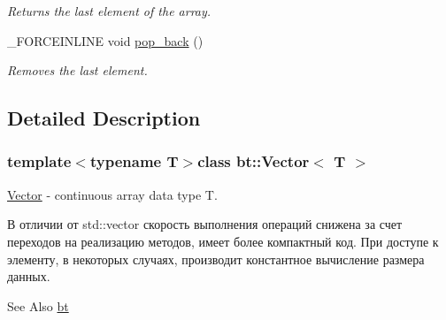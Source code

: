 \begin{DoxyCompactItemize}
\begin{DoxyCompactList}\small\item\em Returns the last element of the array. \end{DoxyCompactList}\item 
\hypertarget{classbt_1_1_vector_a422d57c4c5ee5e5d2ae2538fd973d2f7}{\-\_\-\-F\-O\-R\-C\-E\-I\-N\-L\-I\-N\-E void \hyperlink{classbt_1_1_vector_a422d57c4c5ee5e5d2ae2538fd973d2f7}{pop\-\_\-back} ()}\label{classbt_1_1_vector_a422d57c4c5ee5e5d2ae2538fd973d2f7}

\begin{DoxyCompactList}\small\item\em Removes the last element. \end{DoxyCompactList}\end{DoxyCompactItemize}


\subsection{Detailed Description}
\subsubsection*{template$<$typename T$>$class bt\-::\-Vector$<$ T $>$}

\hyperlink{classbt_1_1_vector}{Vector} -\/ continuous array data type T. 

В отличии от std\-::vector скорость выполнения операций снижена за счет переходов на реализацию методов, имеет более компактный код. При доступе к элементу, в некоторых случаях, производит константное вычисление размера данных.

\begin{DoxySeeAlso}{See Also}
\hyperlink{namespacebt}{bt} 
\end{DoxySeeAlso}
